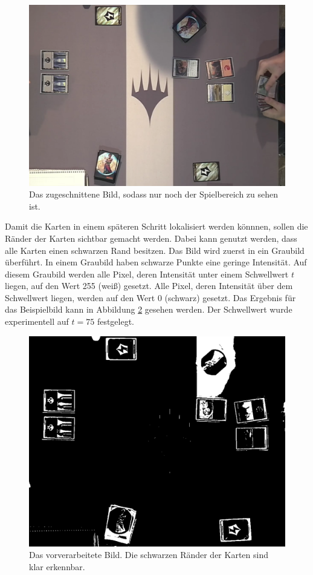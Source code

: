 \begin{figure}[h]
    \centering
		\includegraphics[scale=0.2]{bilder/findCardsPreCut.png}
    	\caption{Das zugeschnittene Bild, sodass nur noch der Spielbereich zu sehen ist.}
\label{fig:findCardsPreCut}
\end{figure}

Damit die Karten in einem späteren Schritt lokalisiert werden könnnen, sollen die Ränder der Karten sichtbar gemacht werden. Dabei kann genutzt werden, dass alle Karten einen schwarzen Rand besitzen.
Das Bild wird zuerst in ein Graubild überführt. In einem Graubild haben schwarze Punkte eine geringe Intensität. Auf diesem Graubild werden alle Pixel, deren Intensität unter einem Schwellwert $t$ liegen, auf den Wert 255 (weiß) gesetzt. Alle Pixel, deren Intensität über dem Schwellwert liegen, werden auf den Wert 0 (schwarz) gesetzt. Das Ergebnis für das Beispielbild kann in Abbildung \ref{fig:findCardsPre} gesehen werden. 
Der Schwellwert wurde experimentell auf $t = 75$ festgelegt.
\begin{figure}[h]
    \centering
		\includegraphics[scale=0.2]{bilder/findCardsPre.png}
    	\caption{Das vorverarbeitete Bild. Die schwarzen Ränder der Karten sind klar erkennbar.}
\label{fig:findCardsPre}
\end{figure}


